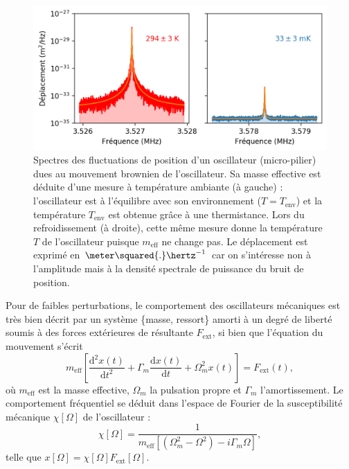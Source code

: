 \documentclass[12pt,a4paper]{article}
\renewcommand{\d}{\mathrm{d}}
\begin{document}
\begin{figure}[b!]
\center
\includegraphics[scale=0.75]{figures/thermal_peak_def_filled.png}
\caption{Spectres des fluctuations de position d'un oscillateur (micro-pilier) dues au mouvement brownien de l'oscillateur.
Sa masse effective est déduite d'une mesure à température ambiante (à gauche) : l'oscillateur est à l'équilibre avec son environnement ($T=T_\mathrm{env}$) et la température $T_\mathrm{env}$ est obtenue grâce à une thermistance.
Lors du refroidissement (à droite), cette même mesure donne la température $T$ de l'oscillateur puisque $m_\mathrm{eff}$ ne change pas. 
Le déplacement est exprimé en $\meter\squared{.}\hertz^{-1}$ car on s'intéresse non à l'amplitude mais à la densité spectrale de puissance du bruit de position.}
\label{fig:thermal_noise}
\end{figure}

Pour de faibles perturbations, le comportement des oscillateurs mécaniques est très bien décrit par un système \{masse, ressort\} amorti à un degré de liberté soumis à des forces extérieures de résultante $F_\mathrm{ext}$, si bien que l'équation du mouvement s'écrit
\begin{equation}
m_\mathrm{eff}\left[\frac{\d ^2 x(t)}{\d t^2} + \Gamma_m \frac{\d  x(t)}{\d t} +  \Omega_m^2 x(t)\right] = F_\mathrm{ext}(t),
\label{eq:eq_of_motion}
\end{equation}
où $m_\mathrm{eff}$ est la masse effective, $\Omega_m$ la pulsation propre et $\Gamma_m$ l'amortissement.
Le comportement fréquentiel se déduit dans l'espace de Fourier de la susceptibilité mécanique $\chi[\Omega]$ de l'oscillateur :
\begin{equation}
\chi[\Omega] = \frac{1}{m_\mathrm{eff}[(\Omega_m^2-\Omega^2)-i\Gamma_m\Omega]},
\end{equation}
telle que $x[\Omega] = \chi[\Omega]F_\mathrm{ext}[\Omega]$.
\end{document}
